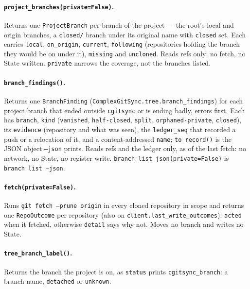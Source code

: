 \paragraph{\texttt{project\_branches(private=False)}.} Returns one
\texttt{ProjectBranch} per branch of the project --- the root's local and
origin branches, a \texttt{closed/} branch under its original name with
\texttt{closed} set. Each carries \texttt{local}, \texttt{on\_origin},
\texttt{current}, \texttt{following} (repositories holding the branch they
would be on under it), \texttt{missing} and \texttt{uncloned}. Reads refs
only: no fetch, no State written. \texttt{private} narrows the coverage,
not the branches listed.

\paragraph{\texttt{branch\_findings()}.} Returns one \texttt{BranchFinding}
(\texttt{ComplexGitSync.tree.branch\_findings}) for each project branch that
ended outside \texttt{cgitsync} or is ending badly, errors first. Each has
\texttt{branch}, \texttt{kind} (\texttt{vanished}, \texttt{half-closed},
\texttt{split}, \texttt{orphaned-private}, \texttt{closed}), its
\texttt{evidence} (repository and what was seen), the \texttt{ledger\_seq} that
recorded a push or a relocation of it, and a content-addressed \texttt{name};
\texttt{to\_record()} is the JSON object \texttt{--json} prints. Reads refs
and the ledger only, as of the last fetch: no network, no State, no register
write. \texttt{branch\_list\_json(private=False)} is \texttt{branch list --json}.

\paragraph{\texttt{fetch(private=False)}.} Runs \texttt{git fetch --prune
origin} in every cloned repository in scope and returns one
\texttt{RepoOutcome} per repository (also on
\texttt{client.last\_write\_outcomes}): \texttt{acted} when it fetched,
otherwise \texttt{detail} says why not. Moves no branch and writes no
State.

\paragraph{\texttt{tree\_branch\_label()}.} Returns the branch the project
is on, as \texttt{status} prints \texttt{cgitsync\_branch}: a branch name,
\texttt{detached} or \texttt{unknown}.


